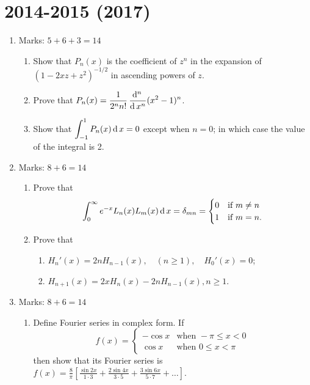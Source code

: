 \documentclass[../main-sheet.tex]{subfiles}
\begin{document}
\section*{2014-2015 (2017)}
\begin{enumerate}
    \item Marks: $ 5+6+3=14 $
    \begin{enumerate}
        \item Show that $ P_n(x) $ is the coefficient of $ z^n $ in the expansion of $ (1-2xz+z^2)^{-1/2} $ in ascending powers of $ z $.
        \item Prove that $ \displaystyle P_n(x)=\frac{1}{2^n n!}\,\frac{\mathrm{d}^{n}\, }{\mathrm{d}\, x^{n}}(x^2-1)^n $.
        \item Show that $\displaystyle \int_{-1}^1 P_n(x)\,\mathrm{d}\, x =0 $ except when $ n=0 $; in which case the value of the integral is 2.
    \end{enumerate}
    \item Marks: $ 8+6=14 $
    \begin{enumerate}
        \item Prove that 
        \[
            \int_0^\infty e^{-x}L_n(x)L_m(x)\,\mathrm{d}\, x=\delta_{mn}=\begin{cases}
            0&\text{if }m\neq n\\
            1&\text{if }m= n.
            \end{cases}
        \]
        \item Prove that \begin{enumerate}
            \item $\displaystyle H_n'(x)=2nH_{n-1}(x),\quad (n\geq 1),\quad H_0'(x)=0 $;
            \item $\displaystyle H_{n+1}(x)=2xH_n(x)-2nH_{n-1}(x), n\geq 1 $.
        \end{enumerate}
    \end{enumerate}
    \item Marks: $ 8+6=14 $
    \begin{enumerate}
        \item Define Fourier series in complex form. If 
        \[
            f(x)=\begin{cases}
            -\cos x &\text{when } -\pi\leq x<0\\
            \cos x &\text{when } 0\leq x<\pi
            \end{cases}
        \]
        then show that its Fourier series is $ \displaystyle f(x)=\frac{8}{\pi}\left[ \frac{\sin 2x}{1\cdot 3}+\frac{2\sin 4x}{3\cdot 5}+\frac{3\sin 6x}{5\cdot 7}+\dots \right] $.\\

\end{enumerate}
\end{enumerate}
\end{document}
